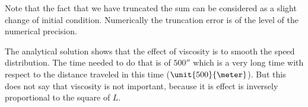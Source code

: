 Note that the fact that we have truncated the sum can be considered as a slight change of initial condition.
Numerically the truncation error is of the level of the numerical precision.

The analytical solution shows that the effect of viscosity is to smooth the speed distribution. The time needed to do that is of $\unit{500}{\second}$
which is a very long time with respect to the distance traveled in this time ($\unit{500}{\meter}$).
But this does not say that viscosity is not important, because it is effect is inversely proportional to the square of $L$.

\HeatSolaa

\HeatSola

\HeatSolb

\HeatSolc

\HeatSold

\HeatSole

\HeatSolf

\HeatSolg


